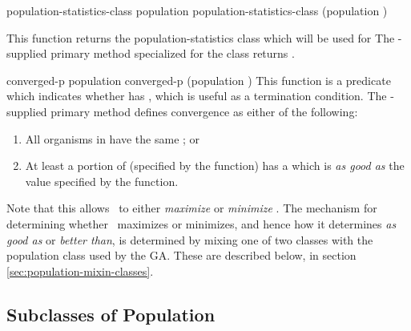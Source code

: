 {\filbreak

{\samepage
\Defgeneric population-statistics-class {population}
 population-statistics-class {(population )}

This function returns the population-statistics class which will be used for
 The \geco-supplied primary method specialized for the
 class returns .
\par}%


\filbreak

{\samepage
\Defgeneric converged-p {population}
 converged-p {(population )}
	\label{population:converged-p}
This function is a predicate which indicates whether  has
, which is useful as a termination
condition. The \geco-supplied primary method defines convergence as
either of the following:
\par}%

\filbreak

{\samepage
  \begin{enumerate}
    \item All organisms in  have the same ; or
    \item At least a portion of  (specified by the
         function) has a 
         which is {\em as good as} the value specified by the
         function.
  \end{enumerate}
}%

\filbreak

Note that this allows \geco\ to either {\em maximize} or {\em minimize}
. The mechanism for determining whether \geco\ maximizes or minimizes,
and hence how it determines {\em as good as} or {\em better than}, is determined by
mixing one of two classes with the population class used by the GA. These
 are described below, in section
\ref{sec:population-mixin-classes}.

\filbreak

{\samepage
\subsection{Subclasses of Population}

}}

